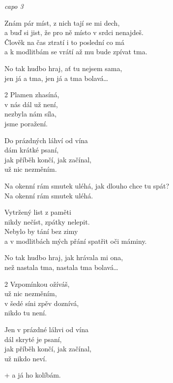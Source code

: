 
\re{}\textit{capo 3}

\ve{}
Znám pár míst, z nich tají se mi dech,\\
a buď si jist, že pro ně místo v srdci nenajdeš.\\
Člověk na čas ztratí i to poslední co má\\
a k modlitbám se vrátí až mu bude zpívat tma.

\re{}
No tak hudbo hraj, ať tu nejsem sama,\\
jen já a tma, jen já a tma bolavá\ldots{}

\begin{multicols}{2}
Plamen zhasíná,\\
v nás dál už není,\\
nezbyla nám síla,\\
jsme poražení.

\vfill\columnbreak\vspace*{\fill}
Do prázdných láhví od vína\\
dám krátké psaní,\\
jak příběh končí, jak začínal,\\
už nic nezměním.
\end{multicols}

\cho{}
Na okenní rám smutek uléhá, jak dlouho chce tu spát?\\
Na okenní rám smutek uléhá. 

\ve{}
Vytržený list z paměti\\
nikdy nečíst, zpátky nelepit.\\
Nebylo by tání bez zimy\\
a v modlitbách mých přání spatřit oči máminy.

\re{}
No tak hudbo hraj, jak hrávala mi ona,\\
než nastala tma, nastala tma bolavá\ldots

\begin{multicols}{2}
Vzpomínkou ožíváš,\\
už nic nezměním,\\
v šedé síni zpěv doznívá,\\
nikdo tu není.

Jen v prázdné láhvi od vína\\
dál skryté je psaní,\\
jak příběh končí, jak začínal,\\
už nikdo neví.
\end{multicols}

\cho{}
+ a já ho kolíbám.

\esong{}